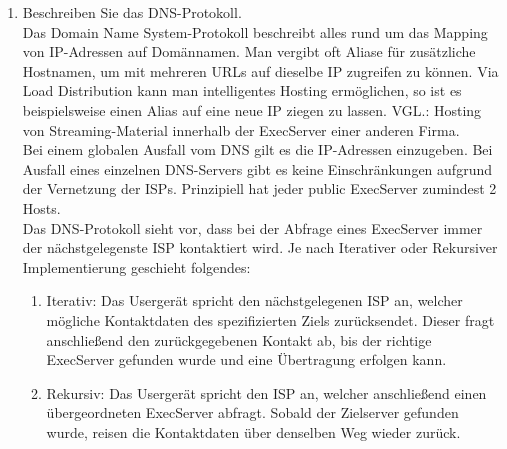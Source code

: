 \documentclass[11pt]{article}
\begin{document}
\begin{enumerate}[\thesection .1]
    \item Beschreiben Sie das DNS-Protokoll.\\
        Das Domain Name System-Protokoll beschreibt alles rund um das Mapping von IP-Adressen auf Domännamen.
        Man vergibt oft Aliase für zusätzliche Hostnamen, um mit mehreren URLs auf dieselbe IP zugreifen zu können.
        Via Load Distribution kann man intelligentes Hosting ermöglichen, so ist es beispielsweise einen Alias auf eine neue IP ziegen zu lassen.
        VGL.: Hosting von Streaming-Material innerhalb der ExecServer einer anderen Firma.\\

        Bei einem globalen Ausfall vom DNS gilt es die IP-Adressen einzugeben.
        Bei Ausfall eines einzelnen DNS-Servers gibt es keine Einschränkungen aufgrund der Vernetzung der ISPs.
        Prinzipiell hat jeder public ExecServer zumindest 2 Hosts.\\

        Das DNS-Protokoll sieht vor, dass bei der Abfrage eines ExecServer immer der nächstgelegenste ISP kontaktiert wird.
        Je nach Iterativer oder Rekursiver Implementierung geschieht folgendes:
        \begin{addmargin}[1em]{1em}
            \begin{enumerate}[$\diamond$]
                \item Iterativ: Das Usergerät spricht den nächstgelegenen ISP an, welcher mögliche Kontaktdaten des spezifizierten Ziels zurücksendet.
                Dieser fragt anschließend den zurückgegebenen Kontakt ab, bis der richtige ExecServer gefunden wurde und eine Übertragung erfolgen kann.

                \item Rekursiv: Das Usergerät spricht den ISP an, welcher anschließend einen übergeordneten ExecServer abfragt. Sobald der Zielserver gefunden wurde,
                reisen die Kontaktdaten über denselben Weg wieder zurück.

            \end{enumerate}
        \end{addmargin}
\end{enumerate}
\end{document}
